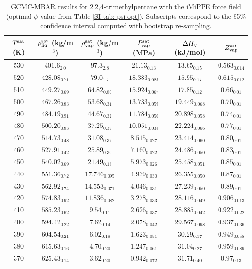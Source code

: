 \documentclass[journal=jctc,manuscript=article]{achemso}
\begin{document}
\begin{table}[htb!]
	\caption{GCMC-MBAR results for 2,2,4-trimethylpentane with the iMiPPE force field (optimal $\psi$ value from Table \ref{SI tab: psi opt}). Subscripts correspond to the 95\% confidence interval computed with bootstrap re-sampling.}
	\begin{center}
		\begin{tabular}{|c|c|c|c|c|c|}
			\hline
			$T^{\rm sat}$ (K) & $\rho_{\rm liq}^{\rm sat}$ (kg/m$^3$) & $\rho_{\rm vap}^{\rm sat}$ (kg/m$^3$) & $P_{\rm vap}^{\rm sat}$ (MPa) & $\Delta H_{\rm v}$ (kJ/mol) & $Z_{\rm vap}^{\rm sat}$ \\ \hline
			530 & $401.6_{2.0}$ & $97.3_{2.8}$ & $21.13_{0.13}$ & $13.65_{0.15}$ & $0.563_{0.014}$ \\
			520 & $428.08_{0.71}$ & $79.0_{1.7}$ & $18.383_{0.085}$ & $15.95_{0.17}$ & $0.615_{0.012}$ \\
			510 & $449.27_{0.69}$ & $64.82_{0.80}$ & $15.924_{0.067}$ & $17.85_{0.12}$ & $0.66_{0.01}$ \\
			500 & $467.26_{0.83}$ & $53.68_{0.34}$ & $13.733_{0.059}$ & $19.449_{0.068}$ & $0.70_{0.01}$ \\
			490 & $484.19_{0.91}$ & $44.67_{0.32}$ & $11.784_{0.050}$ & $20.898_{0.058}$ & $0.74_{0.01}$ \\
			480 & $500.20_{0.83}$ & $37.25_{0.39}$ & $10.051_{0.038}$ & $22.224_{0.066}$ & $0.77_{0.01}$ \\
			470 & $514.73_{0.48}$ & $31.08_{0.39}$ & $8.515_{0.027}$ & $23.414_{0.060}$ & $0.80_{0.01}$ \\
			460 & $527.91_{0.42}$ & $25.89_{0.30}$ & $7.160_{0.022}$ & $24.486_{0.050}$ & $0.83_{0.01}$ \\
			450 & $540.02_{0.69}$ & $21.49_{0.18}$ & $5.973_{0.026}$ & $25.458_{0.051}$ & $0.85_{0.01}$ \\
			440 & $551.36_{0.72}$ & $17.746_{0.095}$ & $4.939_{0.030}$ & $26.355_{0.050}$ & $0.87_{0.01}$ \\
			430 & $562.92_{0.74}$ & $14.553_{0.071}$ & $4.046_{0.031}$ & $27.239_{0.050}$ & $0.89_{0.01}$ \\
			420 & $574.83_{0.92}$ & $11.836_{0.082}$ & $3.278_{0.033}$ & $28.116_{0.049}$ & $0.906_{0.013}$ \\
			410 & $585.23_{0.62}$ & $9.54_{0.11}$ & $2.626_{0.037}$ & $28.885_{0.042}$ & $0.922_{0.022}$ \\
			400 & $594.42_{0.22}$ & $7.62_{0.14}$ & $2.078_{0.042}$ & $29.567_{0.098}$ & $0.937_{0.036}$ \\
			390 & $604.54_{0.21}$ & $6.02_{0.18}$ & $1.623_{0.051}$ & $30.29_{0.17}$ & $0.949_{0.058}$ \\
			380 & $615.63_{0.16}$ & $4.70_{0.20}$ & $1.247_{0.061}$ & $31.04_{0.27}$ & $0.959_{0.089}$ \\
			370 & $625.43_{0.14}$ & $3.62_{0.20}$ & $0.942_{0.072}$ & $31.71_{0.40}$ & $0.97_{0.13}$ \\
			\hline
		\end{tabular}
	\end{center}
\end{table}
\end{document}
